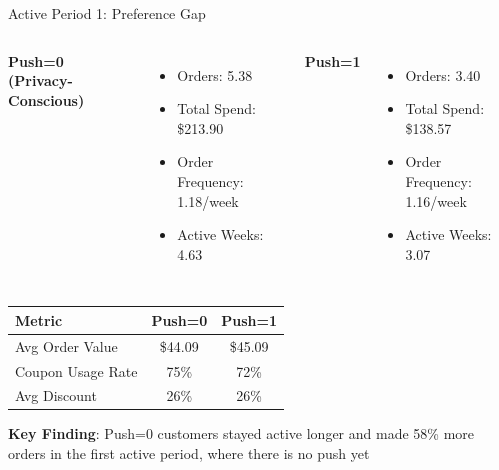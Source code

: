 \documentclass[aspectratio=169]{beamer}  %
\begin{document}
\begin{frame}{Active Period 1: Preference Gap}
\begin{columns}
\textbf{Push=0 (Privacy-Conscious)}
\begin{itemize}
    \item Orders: 5.38
    \item Total Spend: \$213.90
    \item Order Frequency: 1.18/week
    \item Active Weeks: 4.63
\end{itemize}

\textbf{Push=1}
\begin{itemize}
    \item Orders: 3.40
    \item Total Spend: \$138.57
    \item Order Frequency: 1.16/week
    \item Active Weeks: 3.07
\end{itemize}
\end{columns}

\vspace{0.4cm}
\begin{table}
\centering
\scriptsize
\begin{tabular}{lcc}
\toprule
Metric & Push=0 & Push=1 \\
\midrule
Avg Order Value & \$44.09 & \$45.09 \\
Coupon Usage Rate & 75\% & 72\% \\
Avg Discount & 26\% & 26\% \\
\bottomrule
\end{tabular}
\end{table}

\textbf{Key Finding}: Push=0 customers stayed active longer and made 58\% more orders in the first active period, where there is no push yet
\end{frame}
\end{document}

